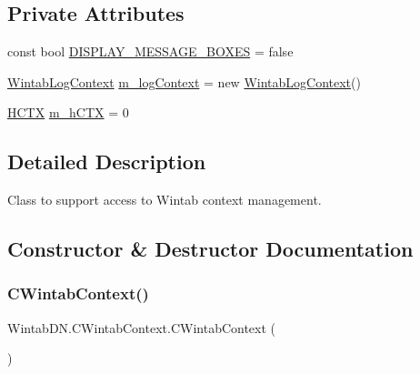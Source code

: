 \subsection*{Private Attributes}
\begin{DoxyCompactItemize}
\item 
const bool \mbox{\hyperlink{class_wintab_d_n_1_1_c_wintab_context_aff540bf7703bf6e96bae3d5bfc3eaaa7}{D\+I\+S\+P\+L\+A\+Y\+\_\+\+M\+E\+S\+S\+A\+G\+E\+\_\+\+B\+O\+X\+ES}} = false
\item 
\mbox{\hyperlink{struct_wintab_d_n_1_1_wintab_log_context}{Wintab\+Log\+Context}} \mbox{\hyperlink{class_wintab_d_n_1_1_c_wintab_context_a076aee1ffdce4966d7f4b46acd39d501}{m\+\_\+log\+Context}} = new \mbox{\hyperlink{struct_wintab_d_n_1_1_wintab_log_context}{Wintab\+Log\+Context}}()
\item 
\mbox{\hyperlink{class_wintab_d_n_1_1_h_c_t_x}{H\+C\+TX}} \mbox{\hyperlink{class_wintab_d_n_1_1_c_wintab_context_ab31f2970a3e0658878f4716dbe2387cd}{m\+\_\+h\+C\+TX}} = 0
\end{DoxyCompactItemize}


\subsection{Detailed Description}
Class to support access to Wintab context management. 



\subsection{Constructor \& Destructor Documentation}
\mbox{\label{class_wintab_d_n_1_1_c_wintab_context_ae2ce09949d3d633790254555f9db2d49}} 
\subsubsection{\texorpdfstring{C\+Wintab\+Context()}{CWintabContext()}}
{\footnotesize\ttfamily Wintab\+D\+N.\+C\+Wintab\+Context.\+C\+Wintab\+Context (\begin{DoxyParamCaption}{ }\end{DoxyParamCaption})\hspace{0.3cm}{\ttfamily [inline]}}



